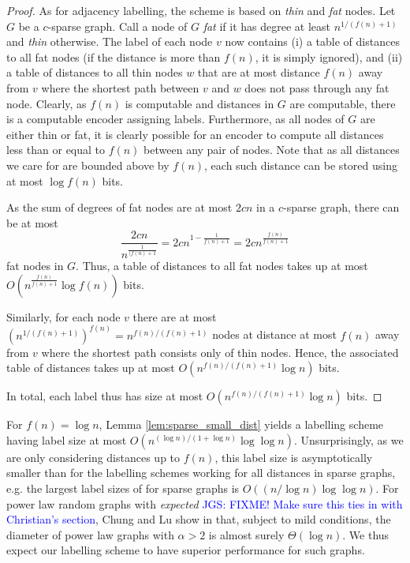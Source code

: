 \begin{proof}
As for adjacency labelling, the scheme is based on \emph{thin} and \emph{fat} nodes. Let $G$ be a $c$-sparse graph. Call
a node of $G$ \emph{fat} if it has degree at least $n^{1/(f(n)+1)}$ and \emph{thin} otherwise.
The label of each node $v$ now contains (i) a table of distances to all fat nodes (if the distance is more than $f(n)$, it is simply ignored), and (ii) a table of distances to all thin nodes $w$ that are at most distance $f(n)$ away from $v$
where the shortest path between $v$ and $w$ does not pass through any fat node.
Clearly, as $f(n)$ is computable and distances in $G$ are computable, there is a computable encoder
assigning labels. Furthermore, as all nodes of $G$ are either thin or fat, it is clearly possible for an encoder to compute
all distances less than or equal to $f(n)$ between any pair of nodes. Note that as all distances we care for 
are bounded above by $f(n)$, each such distance can be stored using at most $\log f(n)$ bits.

As the sum of degrees of fat nodes are at most $2cn$ in a $c$-sparse graph, there can be at most
$$
\frac{2cn}{n^{\frac{1}{(f(n)+1}}} = 2cn^{1-\frac{1}{f(n)+1}} = 2cn^{\frac{f(n)}{f(n)+1}}
$$
fat nodes in $G$. Thus, a table of distances to all fat nodes takes up at most $O(n^{\frac{f(n)}{f(n)+1}} \log f(n))$ bits.

Similarly, for each node $v$ there are at most $(n^{1/(f(n)+1)})^{f(n)} = n^{f(n)/(f(n)+1)}$ nodes at distance at most $f(n)$ away from $v$ where the shortest path consists only of thin nodes. Hence, the associated table of distances
takes up at most $O(n^{f(n)/(f(n)+1)} \log n)$ bits.

In total, each label thus has size at most $O(n^{f(n)/(f(n)+1)} \log n)$ bits.
\end{proof}

For $f(n) = \log n$, Lemma \ref{lem:sparse_small_dist} yields a labelling scheme having label size
at most $O\left(n^{(\log n)/(1+ \log n)} \log\log n \right)$. Unsurprisingly, as we are only considering distances up
to $f(n)$, this label size is asymptotically smaller than for the labelling
schemes working for all distances in sparse graphs, e.g. the largest label sizes of \cite{DBLP:journals/corr/GawrychowskiKU15} for sparse graphs is $O((n/\log n) \log\log n)$.
For power law random graphs with \emph{expected} \textcolor{blue}{JGS: FIXME! Make sure this ties in with Christian's section}, Chung and Lu show in \cite{chung2004average} that, subject to mild conditions, the diameter of power law graphs with $\alpha > 2$ is almost surely $\Theta(\log n)$. We thus expect our labelling scheme to have
superior performance for such graphs.
